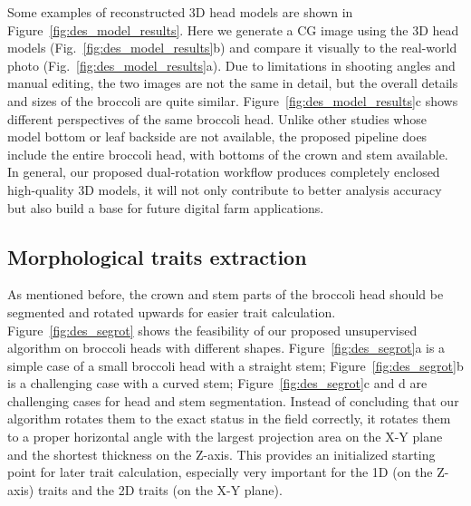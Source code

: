 

Some examples of reconstructed 3D head models are shown in Figure~\ref{fig:des_model_results}. Here we generate a CG image using the 3D head models (Fig.~\ref{fig:des_model_results}b) and compare it visually to the real-world photo (Fig.~\ref{fig:des_model_results}a). Due to limitations in shooting angles and manual editing, the two images are not the same in detail, but the overall details and sizes of the broccoli are quite similar. Figure~\ref{fig:des_model_results}c shows different perspectives of the same broccoli head. Unlike other studies whose model bottom \citep{kochi_3d_2018} or leaf backside \citep{cao_quantifying_2019} are not available, the proposed pipeline does include the entire broccoli head, with bottoms of the crown and stem available. In general, our proposed dual-rotation workflow produces completely enclosed high-quality 3D models, it will not only contribute to better analysis accuracy but also build a base for future digital farm applications.



\subsection{Morphological traits extraction}

As mentioned before, the crown and stem parts of the broccoli head should be segmented and rotated upwards for easier trait calculation. Figure~\ref{fig:des_segrot} shows the feasibility of our proposed unsupervised algorithm on broccoli heads with different shapes. Figure~\ref{fig:des_segrot}a is a simple case of a small broccoli head with a straight stem; Figure~\ref{fig:des_segrot}b is a challenging case with a curved stem;  Figure~\ref{fig:des_segrot}c and d are challenging cases for head and stem segmentation. Instead of concluding that our algorithm rotates them to the exact status in the field correctly, it rotates them to a proper horizontal angle with the largest projection area on the X-Y plane and the shortest thickness on the Z-axis. This provides an initialized starting point for later trait calculation, especially very important for the 1D (on the Z-axis) traits and the 2D traits (on the X-Y plane).



